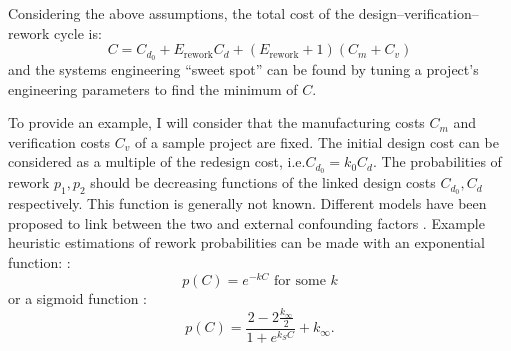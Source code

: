 \documentclass[a4paper,nobib,justified,final]{tufte-book}
\begin{document}
Considering the above assumptions, the total cost of the design--verification--rework cycle is:
\begin{equation}
	C = C_{d_0} + E_{\mathrm{rework}} C_d + \left( E_{\mathrm{rework}} + 1 \right) \left( C_m + C_v \right)
\end{equation}
and the systems engineering ``sweet spot'' can be found by tuning a project's engineering parameters to find the minimum of \( C \).

To provide an example, I will consider that the manufacturing costs \( C_m \) and verification costs \( C_v \) of a sample project are fixed. The initial design cost can be considered as a multiple of the redesign cost, i.e.\@ \( C_{d_0} = k_0 C_d \).
The probabilities of rework \( p_1,p_2 \) should be decreasing functions of the linked design costs \( C_{d_0}, C_d \) respectively. This function is generally not known. Different models have been proposed to link between the two and external confounding factors \autocite{leImpactsConcurrencyIteration2012,tanRelativeImpactEarly2017}. Example heuristic estimations of rework probabilities can be made with an exponential function: \cite{leImpactsConcurrencyIteration2012}: \begin{equation}
p(C) = e^{-kC} \text{ for some } k
\end{equation} or a sigmoid function \cite{kucharavyApplicationSshapedCurves2011}: 
%
\begin{equation}
p(C) = \frac{2 - 2\frac{k_\infty}{2} }{1+e^{k_S C}} + k_\infty.
\end{equation}
\end{document}
